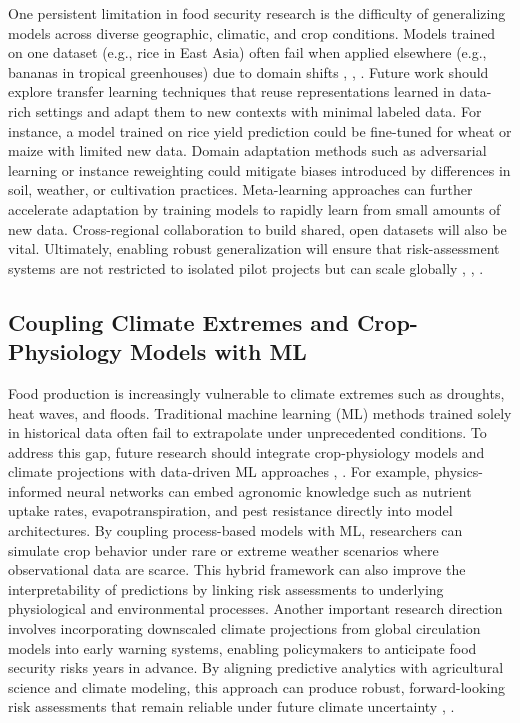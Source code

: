 \documentclass[preprint,12pt]{elsarticle}
\begin{document}
	One persistent limitation in food security research is the difficulty of
	generalizing models across diverse geographic, climatic, and crop
	conditions. Models trained on one dataset (e.g., rice in East Asia)
	often fail when applied elsewhere (e.g., bananas in tropical
	greenhouses) due to domain shifts \cite{ref64}, \cite{ref65}, \cite{ref67}. Future work
	should explore transfer learning techniques that reuse representations
	learned in data-rich settings and adapt them to new contexts with
	minimal labeled data. For instance, a model trained on rice yield
	prediction could be fine-tuned for wheat or maize with limited new data.
	Domain adaptation methods such as adversarial learning or instance
	reweighting could mitigate biases introduced by differences in soil,
	weather, or cultivation practices. Meta-learning approaches can further
	accelerate adaptation by training models to rapidly learn from small
	amounts of new data. Cross-regional collaboration to build shared, open
	datasets will also be vital. Ultimately, enabling robust generalization
	will ensure that risk-assessment systems are not restricted to isolated
	pilot projects but can scale globally \cite{ref64}, \cite{ref65}, \cite{ref67}.
	
	\subsection{Coupling Climate Extremes and Crop-Physiology Models with ML}
	
	Food production is increasingly vulnerable to climate extremes such as
	droughts, heat waves, and floods. Traditional machine learning (ML)
	methods trained solely in historical data often fail to extrapolate
	under unprecedented conditions. To address this gap, future research
	should integrate crop-physiology models and climate projections with
	data-driven ML approaches \cite{ref65}, \cite{ref67}. For example, physics-informed
	neural networks can embed agronomic knowledge such as nutrient uptake
	rates, evapotranspiration, and pest resistance directly into model
	architectures. By coupling process-based models with ML, researchers can
	simulate crop behavior under rare or extreme weather scenarios where
	observational data are scarce. This hybrid framework can also improve
	the interpretability of predictions by linking risk assessments to
	underlying physiological and environmental processes. Another important
	research direction involves incorporating downscaled climate projections
	from global circulation models into early warning systems, enabling
	policymakers to anticipate food security risks years in advance. By
	aligning predictive analytics with agricultural science and climate
	modeling, this approach can produce robust, forward-looking risk
	assessments that remain reliable under future climate uncertainty
	\cite{ref65}, \cite{ref67}.
	
\end{document}
